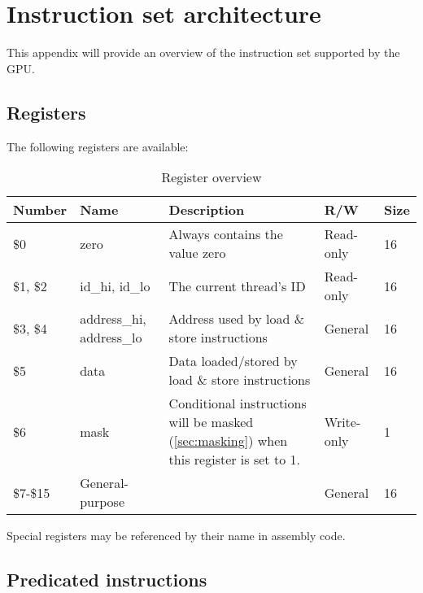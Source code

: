 \documentclass[../main/report.tex]{subfiles}
\begin{document}
\chapter{Instruction set architecture}

This appendix will provide an overview of the instruction set supported by the GPU.

\clearpage

\section{Registers}

The following registers are available:

\begin{table}[H]
    \begin{tabular}{|l|l|p{4cm}|l|l|}
    \hline
    \textbf{Number} & \textbf{Name} & \textbf{Description}                                                             & \textbf{R/W}    & \textbf{Size} \\ \hline \hline
    \$0       & zero                & Always contains the value zero                                          & Read-only  & 16   \\ \hline
    \$1, \$2 & id\_hi, id\_lo      & The current thread's ID                                                 & Read-only  & 16   \\ \hline
    \$3, \$4 & address\_hi, address\_lo & Address used by load \& store instructions                              & General    & 16   \\ \hline
    \$5       & data               & Data loaded/stored by load \& store instructions                        & General    & 16   \\ \hline
    \$6       & mask               & Conditional instructions will be masked (\autoref{sec:masking}) when this register is set to 1. & Write-only & 1    \\ \hline
    \$7-\$15  & General-purpose    & ~                                                                       & General    & 16   \\ \hline
    \end{tabular}
    \caption{Register overview}
    \label{table:registers}
\end{table}

Special registers may be referenced by their name in assembly code.

\clearpage

\section{Predicated instructions}
\label{sec:masking}
\end{document}
